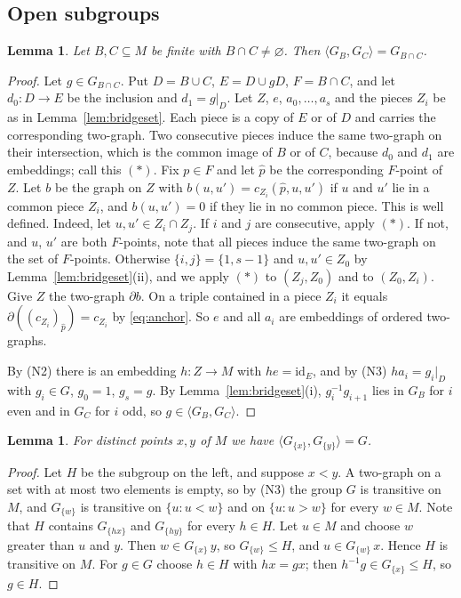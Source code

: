 \documentclass[11pt,a4paper]{article}
\newtheorem{lemma}[theorem]{Lemma}
\theoremstyle{definition}
\newcommand{\id}{\mathrm{id}}
\begin{document}
\subsection{Open subgroups}

\begin{lemma}\label{lem:stab2a}
Let $B,C\subseteq M$ be finite with $B\cap C\ne\varnothing$. Then
$\langle G_B,G_C\rangle=G_{B\cap C}$.
\end{lemma}

\begin{proof}
Let $g\in G_{B\cap C}$. Put $D=B\cup C$, $E=D\cup gD$, $F=B\cap C$, and let
$d_0\colon D\to E$ be the inclusion and $d_1=g|_D$. Let $Z$, $e$,
$a_0,\dots,a_s$ and the pieces $Z_i$ be as in Lemma~\ref{lem:bridgeset}. Each
piece is a copy of $E$ or of $D$ and carries the corresponding two-graph.
Two consecutive pieces induce the same two-graph on their intersection, which
is the common image of $B$ or of $C$, because $d_0$ and $d_1$ are embeddings;
call this $(\ast)$. Fix $p\in F$ and let $\hat p$ be the corresponding
$F$-point of $Z$. Let $b$ be the graph on $Z$ with
$b(u,u')=c_{Z_i}(\hat p,u,u')$ if $u$ and $u'$ lie in a common piece $Z_i$, and
$b(u,u')=0$ if they lie in no common piece. This is well defined. Indeed, let
$u,u'\in Z_i\cap Z_j$. If $i$ and $j$ are consecutive, apply $(\ast)$. If not,
and $u$, $u'$ are both $F$-points, note that all pieces induce the same
two-graph on the set of $F$-points. Otherwise $\{i,j\}=\{1,s-1\}$ and
$u,u'\in Z_0$ by Lemma~\ref{lem:bridgeset}(ii), and we apply $(\ast)$ to
$(Z_j,Z_0)$ and to $(Z_0,Z_i)$. Give $Z$ the two-graph $\partial b$. On a
triple contained in a piece $Z_i$ it equals $\partial((c_{Z_i})_{\hat p})=c_{Z_i}$
by \eqref{eq:anchor}. So $e$ and all $a_i$ are embeddings of ordered
two-graphs.

By (N2) there is an embedding $h\colon Z\to M$ with $he=\id_E$, and by (N3)
$ha_i=g_i|_D$ with $g_i\in G$, $g_0=1$, $g_s=g$. By
Lemma~\ref{lem:bridgeset}(i), $g_i^{-1}g_{i+1}$ lies in $G_B$ for $i$ even and
in $G_C$ for $i$ odd, so $g\in\langle G_B,G_C\rangle$.
\end{proof}

\begin{lemma}\label{lem:stab2b}
For distinct points $x,y$ of $M$ we have $\langle G_{\{x\}},G_{\{y\}}\rangle=G$.
\end{lemma}

\begin{proof}
Let $H$ be the subgroup on the left, and suppose $x<y$. A two-graph on a set
with at most two elements is empty, so by (N3) the group $G$ is transitive on
$M$, and $G_{\{w\}}$ is transitive on $\{u:u<w\}$ and on $\{u:u>w\}$ for every
$w\in M$. Note that $H$ contains $G_{\{hx\}}$ and $G_{\{hy\}}$ for every
$h\in H$. Let $u\in M$ and choose $w$ greater than $u$ and $y$. Then
$w\in G_{\{x\}}\,y$, so $G_{\{w\}}\le H$, and $u\in G_{\{w\}}\,x$. Hence $H$
is transitive on $M$. For $g\in G$ choose $h\in H$ with $hx=gx$; then
$h^{-1}g\in G_{\{x\}}\le H$, so $g\in H$.
\end{proof}
\end{document}
